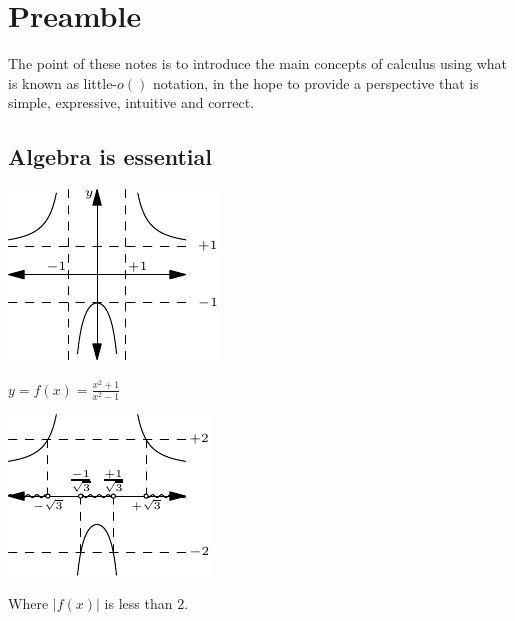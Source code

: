 \chapter*{Preamble}

The point of these notes is to introduce the main concepts of calculus using what is known as little-$o()$ notation, in the hope to provide a perspective that is simple, expressive, intuitive and correct.

\section*{Algebra is essential}
\begin{marginfigure}
\begin{center}
\includegraphics[width=0.75\linewidth]{graphics/algebra1.pdf}
\end{center}
\caption{$y=f(x)=\frac{x^2+1}{x^2-1}$}
\label{fig:algebra1}
\end{marginfigure}
\begin{marginfigure}
\begin{center}
\includegraphics[width=0.75\linewidth]{graphics/algebra2.pdf}
\end{center}
\caption{Where $|f(x)|$ is less than $2$.}
\label{fig:algebra2}
\end{marginfigure}
